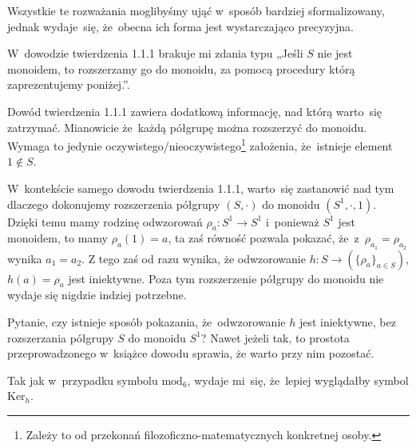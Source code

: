 \documentclass[a4paper,11pt]{article}
\begin{document}
Wszystkie te rozważania moglibyśmy ująć w~sposób bardziej sformalizowany,
jednak wydaje~się, że~obecna ich forma jest wystarczająco precyzyjna.

\vspace{\spaceFour}





\start {} W~dowodzie twierdzenia 1.1.1 brakuje mi zdania typu
„Jeśli $S$ nie jest monoidem, to rozszerzamy go do monoidu, za pomocą
procedury którą zaprezentujemy poniżej.”.

\vspace{\spaceFour}





\start {} Dowód twierdzenia 1.1.1 zawiera dodatkową informację,
nad którą warto~się zatrzymać. Mianowicie że~każdą półgrupę można
rozszerzyć do monoidu. Wymaga to jedynie
oczywistego/nieoczywistego\footnote{Zależy to od przekonań
  filozoficzno-matematycznych konkretnej osoby.} założenia, że~istnieje
element $1 \notin S$.

W~kontekście samego dowodu twierdzenia 1.1.1, warto~się zastanowić nad
tym dlaczego dokonujemy rozszerzenia półgrupy $( S, \cdot )$ do
monoidu $( S^{ 1 }, \cdot, 1 )$. Dzięki temu mamy rodzinę odwzorowań
$\rho_{ a } : S^{ 1 } \to S^{ 1 }$ i~ponieważ $S^{ 1 }$ jest monoidem,
to mamy $\rho_{ a }( 1 ) = a$, ta zaś równość pozwala pokazać,
że~z~$\rho_{ a_{ 1 } } = \rho_{ a_{ 2 } }$ wynika $a_{ 1 } = a_{ 2 }$.
Z tego zaś od razu wynika, że odwzorowanie
$h : S \to ( \{ \rho_{ a } \}_{ a \in S } )$, $h( a ) = \rho_{ a }$
jest iniektywne. Poza tym rozszerzenie półgrupy do monoidu nie wydaje
się nigdzie indziej potrzebne.

Pytanie, czy istnieje sposób pokazania, że~odwzorowanie $h$ jest
iniektywne, bez rozszerzania półgrupy $S$ do monoidu $S^{ 1 }$? Nawet
jeżeli tak, to prostota przeprowadzonego w~książce dowodu sprawia, że
warto przy nim pozostać.

\vspace{\spaceFour}





\start {} Tak jak w~przypadku symbolu $\textrm{mod}_{ 6 }$,
wydaje mi~się, że~lepiej wyglądałby symbol $\textrm{Ker}_{ h }$.

\vspace{\spaceFour}
\end{document}
